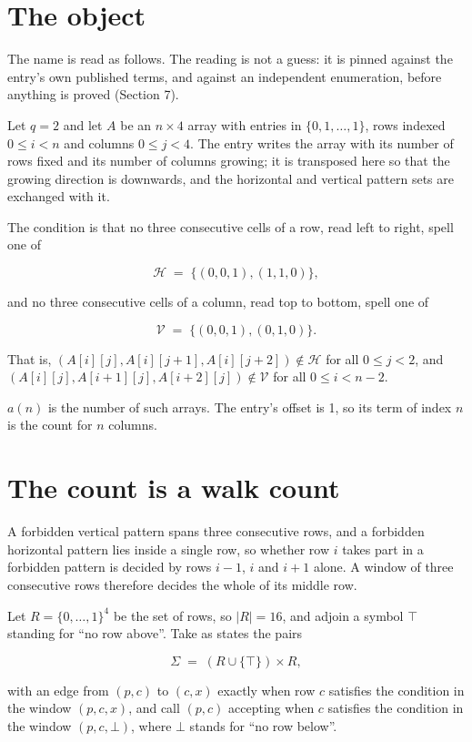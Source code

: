 \documentclass[11pt]{article}
\theoremstyle{definition}
\begin{document}
\section{The object}

The name is read as follows. The reading is not a guess: it is pinned against the entry's own published terms, and against an independent enumeration, before anything is proved (Section 7).

Let $q = 2$ and let $A$ be an $n \times 4$ array with entries in $\{0,1,\dots,1\}$, rows indexed $0 \le i < n$ and columns $0 \le j < 4$. The entry writes the array with its number of rows fixed and its number of columns growing; it is transposed here so that the growing direction is downwards, and the horizontal and vertical pattern sets are exchanged with it.

The condition is that no three consecutive cells of a row, read left to right, spell one of

\[\mathcal{H} \;=\; \{(0,0,1), (1,1,0)\},\]

and no three consecutive cells of a column, read top to bottom, spell one of

\[\mathcal{V} \;=\; \{(0,0,1), (0,1,0)\}.\]

That is, $(A[i][j],A[i][j{+}1],A[i][j{+}2]) \notin \mathcal{H}$ for all $0 \le j < 2$, and $(A[i][j],A[i{+}1][j],A[i{+}2][j]) \notin \mathcal{V}$ for all $0 \le i < n-2$.

$a(n)$ is the number of such arrays. The entry's offset is 1, so its term of index $n$ is the count for $n$ columns.

\section{The count is a walk count}

A forbidden vertical pattern spans three consecutive rows, and a forbidden horizontal pattern lies inside a single row, so whether row $i$ takes part in a forbidden pattern is decided by rows $i-1$, $i$ and $i+1$ alone. A window of three consecutive rows therefore decides the whole of its middle row.

Let $R = \{0,\dots,1\}^{4}$ be the set of rows, so $|R| = 16$, and adjoin a symbol $\top$ standing for ``no row above''. Take as states the pairs

\[\Sigma \;=\; (R \cup \{\top\}) \times R,\]

with an edge from $(p,c)$ to $(c,x)$ exactly when row $c$ satisfies the condition in the window $(p,c,x)$, and call $(p,c)$ accepting when $c$ satisfies the condition in the window $(p,c,\bot)$, where $\bot$ stands for ``no row below''.
\end{document}
